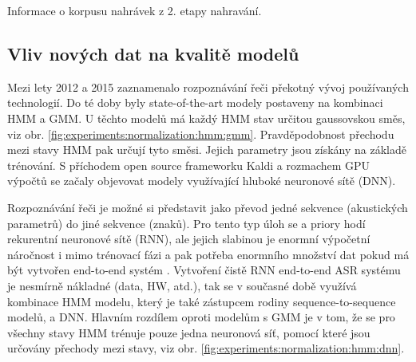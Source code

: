 \begin{table}[htpb]
  \centering
  \def\arraystretch{1.5}
  \caption{Informace o korpusu nahrávek z 2. etapy nahravání.}
  \label{tab:experiments:normalization:recording}
\end{table}

\subsection{Vliv nových dat na kvalitě modelů}
\label{chap:experiments:normalization:corpus}

Mezi lety 2012 a 2015 zaznamenalo rozpoznávání řeči překotný vývoj používaných technologií. Do té doby byly state-of-the-art modely postaveny na kombinaci HMM a  GMM. U těchto modelů má každý HMM stav určitou gaussovskou směs, viz obr. \ref{fig:experiments:normalization:hmm:gmm}. Pravděpodobnost přechodu mezi stavy HMM pak určují tyto směsi. Jejich parametry jsou získány na základě trénování. S příchodem open source frameworku Kaldi \cite{Kaldi2011} a rozmachem GPU výpočtů se začaly objevovat modely využívající hluboké neuronové sítě (DNN).

Rozpoznávání řeči je možné si představit jako převod jedné sekvence (akustických parametrů) do jiné sekvence (znaků). Pro tento typ úloh se a priory hodí rekurentní neuronové sítě (RNN), ale jejich slabinou je enormní výpočetní náročnost i mimo trénovací fázi a pak potřeba enormního množství dat pokud má být vytvořen end-to-end systém \cite{Hannun2014}. Vytvoření čistě RNN end-to-end ASR systému je nesmírně nákladné (data, HW, atd.), tak se v současné době využívá kombinace HMM modelu, který je také zástupcem rodiny sequence-to-sequence modelů, a DNN. Hlavním rozdílem oproti modelům s GMM je v tom, že se pro všechny stavy HMM trénuje pouze jedna neuronová síť, pomocí které jsou určovány přechody mezi stavy, viz obr. \ref{fig:experiments:normalization:hmm:dnn}.



